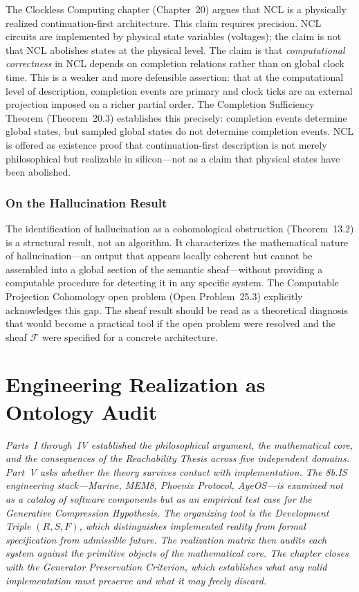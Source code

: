 \documentclass[12pt, oneside]{book}
\theoremstyle{flyxion}
\theoremstyle{definition}
\begin{document}
The Clockless Computing chapter (Chapter~20) argues that NCL is a
physically realized continuation-first architecture. This claim
requires precision. NCL circuits are implemented by physical state
variables (voltages); the claim is not that NCL abolishes states at
the physical level. The claim is that \emph{computational correctness}
in NCL depends on completion relations rather than on global clock
time. This is a weaker and more defensible assertion: that at the
computational level of description, completion events are primary
and clock ticks are an external projection imposed on a richer
partial order. The Completion Sufficiency Theorem (Theorem~20.3)
establishes this precisely: completion events determine global states,
but sampled global states do not determine completion events. NCL is
offered as existence proof that continuation-first description is
not merely philosophical but realizable in silicon---not as a claim
that physical states have been abolished.

\section{On the Hallucination Result}

The identification of hallucination as a cohomological obstruction
(Theorem~13.2) is a structural result, not an algorithm. It
characterizes the mathematical nature of hallucination---an output
that appears locally coherent but cannot be assembled into a global
section of the semantic sheaf---without providing a computable
procedure for detecting it in any specific system. The Computable
Projection Cohomology open problem (Open Problem~25.3) explicitly
acknowledges this gap. The sheaf result should be read as a
theoretical diagnosis that would become a practical tool if the open
problem were resolved and the sheaf $\mathcal{F}$ were specified for
a concrete architecture.


\part{Engineering Realization as Ontology Audit}

\noindent\textit{Parts~I through~IV established the
philosophical argument, the mathematical core, and the
consequences of the Reachability Thesis across five
independent domains. Part~V asks whether the theory
survives contact with implementation. The 8b.IS
engineering stack---Marine, MEM\textbar{}8, Phoenix
Protocol, AyeOS---is examined not as a catalog of
software components but as an empirical test case for
the Generative Compression Hypothesis. The organizing
tool is the Development Triple $(R, S, F)$, which
distinguishes implemented reality from formal
specification from admissible future. The realization
matrix then audits each system against the primitive
objects of the mathematical core. The chapter closes
with the Generator Preservation Criterion, which
establishes what any valid implementation must
preserve and what it may freely discard.}
\end{document}
